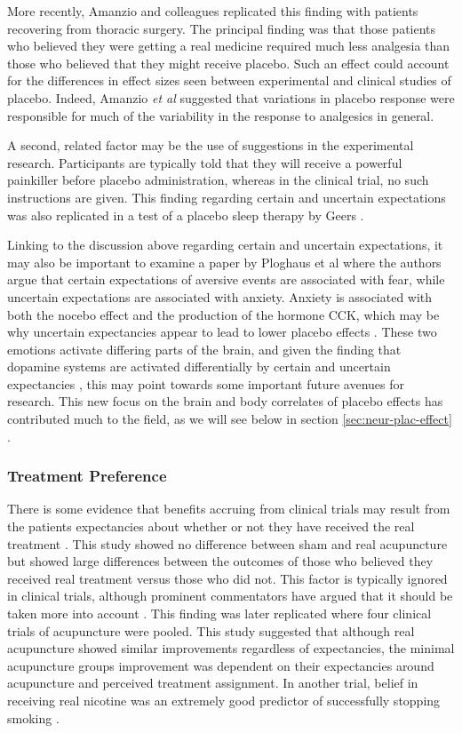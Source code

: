 More recently,  Amanzio and colleagues \cite{Amanzio2001} replicated this finding with patients recovering from thoracic surgery. The principal finding was that those patients who believed they were getting a real medicine required much less analgesia than those who believed that they might receive placebo. Such an effect could account for the differences in effect sizes seen between experimental and clinical studies of placebo. Indeed, Amanzio \textit{et al } suggested that variations in placebo response were responsible for much of the variability in the response to analgesics in general.

A second, related factor may be the use of suggestions in the experimental research. Participants are typically told that they will receive a powerful painkiller before placebo administration, whereas in the clinical trial, no such instructions are given. This finding regarding certain and uncertain expectations was also replicated in a test of a placebo sleep therapy by Geers  \cite{Geers2005a}.

Linking to the discussion above regarding certain and uncertain expectations, it may also be important to examine a paper by Ploghaus et al \cite{Ploghaus2003} where the authors argue that certain expectations of aversive events are associated with fear, while uncertain expectations are associated with anxiety. Anxiety is associated with both the nocebo effect and the production of the hormone CCK, which may be why uncertain expectancies appear to lead to lower placebo effects \cite{Colloca2008b}. These two emotions activate differing parts of the brain, and given the finding that dopamine systems are activated differentially by certain and uncertain expectancies \cite{Scott2007a}, this may point towards some important future avenues for research. This new focus on the brain and body correlates of placebo effects has contributed much to the field, as we will see below in section \ref{sec:neur-plac-effect} .

\subsubsection{Treatment Preference}
\label{sec:treatment-preference}


There is some evidence that benefits accruing from clinical trials may result from the patients expectancies about whether or not they have received the real treatment \cite{Bausell2005}. This study showed no difference between sham and real acupuncture but showed large differences between the outcomes of those who believed they received real treatment versus those who did not. This factor is typically ignored in clinical trials, although prominent commentators have argued that it should be taken more into account \cite{Benedetti2007}. This finding was later replicated \cite{Linde2007}  where four clinical trials of acupuncture were pooled. This study suggested that although real acupuncture showed similar improvements regardless of expectancies, the minimal acupuncture groups improvement was dependent on their expectancies around acupuncture and perceived treatment assignment. In another trial, belief in receiving real nicotine was an extremely good predictor of successfully stopping smoking \cite{Benedetti2008}. 

